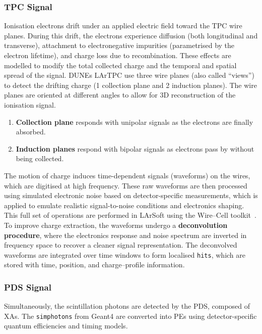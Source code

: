\subsubsection{TPC Signal}
Ionisation electrons drift under an applied electric field toward the TPC wire planes. During this drift, the electrons experience diffusion (both longitudinal and transverse), attachment to electronegative impurities (parametrised by the electron lifetime), and charge loss due to recombination. These effects are modelled to modify the total collected charge and the temporal and spatial spread of the signal. \ac{DUNE}s \ac{LArTPC} use three wire planes (also called ``views'') to detect the drifting charge (1 collection plane and 2 induction planes). The wire planes are oriented at different angles to allow for 3D reconstruction of the ionisation signal.

\begin{enumerate}
    \item\textbf{Collection plane} responds with unipolar signals as the electrons are finally absorbed.
    \item\textbf{Induction planes} respond with bipolar signals as electrons pass by without being collected.
\end{enumerate}

The motion of charge induces time-dependent signals (waveforms) on the wires, which are digitised at high frequency. These raw waveforms are then processed using simulated electronic noise based on detector-specific measurements, which is applied to emulate realistic signal-to-noise conditions and electronics shaping. This full set of operations are performed in \ac{LArSoft} using the Wire--Cell toolkit~\cite{Abratenko_2022}. To improve charge extraction, the waveforms undergo a \textbf{deconvolution procedure}, where the electronics response and noise spectrum are inverted in frequency space to recover a cleaner signal representation. The deconvolved waveforms are integrated over time windows to form localised \texttt{hits}, which are stored with time, position, and charge--profile information.

\subsubsection{PDS Signal}
Simultaneously, the scintillation photons are detected by the \ac{PDS}, composed of \ac{XA}s. The \texttt{simphotons} from Geant4 are converted into \ac{PE}s using detector-specific quantum efficiencies and timing models.


